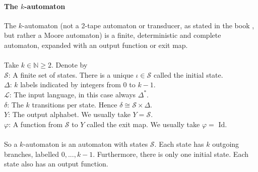 \documentclass{article}
\begin{document}
\paragraph{The $k$-automaton}
The $k$-automaton (not a 2-tape automaton or transducer, as stated in the
book \cite{F1}, but rather a Moore automaton) is a finite, deterministic and 
complete automaton, expanded with an output function or exit map.\\
\\
Take $k \in \mathbb{N} \ge 2$. Denote by\\
$\mathcal{S}$: A finite set of states. There is a unique 
$\iota \in \mathcal{S}$ called the initial state.\\
$\Delta$: $k$ labels indicated by integers from 0 to $k - 1$.\\
$\mathcal{L}$: The input language, in this case always $\Delta^*$.\\
$\delta$: The $k$ transitions per state. Hence 
$\delta \cong \mathcal{S} \times \Delta$.\\
$Y$: The output alphabet. We usually take $Y = \mathcal{S}$.\\
$\varphi$: A function from $\mathcal{S}$ to $Y$ called the exit map. We
           usually take $\varphi =$ Id.\\
\\
So a $k$-automaton is an automaton with states $\mathcal{S}$. Each state has
$k$ outgoing branches, labelled $0, ..., k - 1$. Furthermore, there is only
one initial state. Each state also has an output function.
\end{document}
